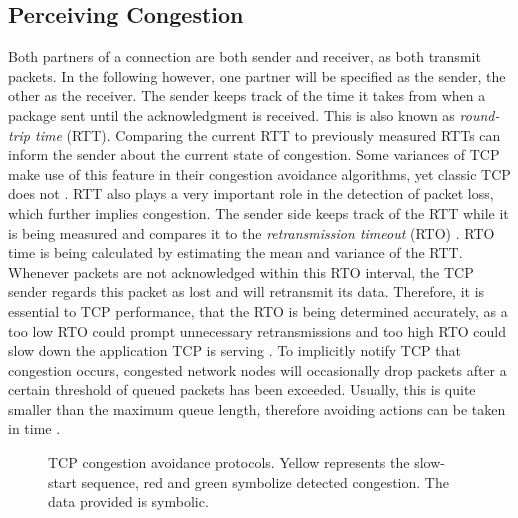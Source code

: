 \documentclass[a4paper,conference]{IEEEtran}
\begin{document}
\subsection{Perceiving Congestion}
\label{sec:P_C_marker}
Both partners of a connection are both sender and receiver, as both transmit packets. In the following however, one partner will be specified as the sender, the other as the receiver. The sender keeps track of the time it takes from when a package sent until the acknowledgment is received. This is also known as \textit{round-trip time} (RTT). Comparing the current RTT to previously measured RTTs can inform the sender about the current state of congestion. Some variances of TCP make use of this feature in their congestion avoidance algorithms, yet classic TCP does not \cite{huston2000tcp,jacobson1995congestion}. RTT also plays a very important role in the detection of packet loss, which further implies congestion. The sender side keeps track of the RTT while it is being measured and compares it to the \textit{retransmission timeout} (RTO) \cite{jacobson1992tcp}. RTO time is being calculated by estimating the mean and variance of the RTT. Whenever packets are not acknowledged within this RTO interval, the TCP sender regards this packet as lost and will retransmit its data. Therefore, it is essential to TCP performance, that the RTO is being determined accurately, as a too low RTO could prompt unnecessary retransmissions and too high RTO could slow down the application TCP is serving \cite{huston2000tcp,jacobson1995congestion}. To implicitly notify TCP that congestion occurs, congested network nodes will occasionally drop packets after a certain threshold of queued packets has been exceeded. Usually, this is quite smaller than the maximum queue length, therefore avoiding actions can be taken in time \cite{ramakrishnan1999proposal}.

\begin{figure}
  \centering
  \caption{TCP congestion avoidance protocols. Yellow represents the slow-start sequence, red and green symbolize detected congestion. The data provided is symbolic.}
  \label{fig:tcp_congestion_avoidance_protocols}
\end{figure}
\end{document}
